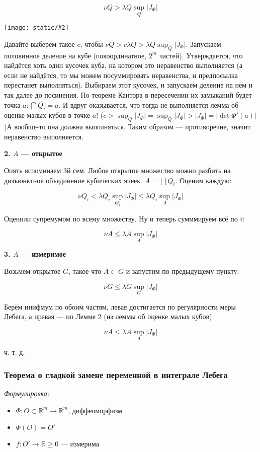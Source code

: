 \documentclass{article}
\def\images#1#2{\begin{center}\texttt{[image: static/\#2]}\end{center}}
\begin{document}
\[\nu Q > \lambda Q \sup_{Q} |J_{\Phi}|\]

\images{0.3}{diff_del.jpg}

Давайте выберем такое $c$, чтобы $\nu Q > c \lambda Q > \lambda Q \sup_{Q} |J_{\Phi}|$. Запускаем половинное деление на кубе (покоординатное, $2^m$ частей). Утверждается, что найдётся хоть один кусочек куба, на котором это неравенство выполняется (а если не найдётся, то мы можем посуммировать неравенства, и предпосылка перестанет выполняться). Выбираем этот кусочек, и запускаем деление на нём и так далее до посинения. По теореме Кантора в пересечении их замыканий будет точка $a: \bigcap \overline{Q_i} = a$. И вдруг оказывается, что тогда не выполняется лемма об оценке малых кубов в точке $a$! ($c > \sup_{Q} |J_{\Phi}| = \sup_{\overline{Q}} |J_{\Phi}| > |J_{\Phi}| = |\det \Phi'(a)|$)А вообще-то она должна выполняться. Таким образом --- противоречие, значит неравенство выполняется.

\textbf{2. $A$ --- открытое}

Опять вспоминаем 3й сем. Любое открытое множество можно разбить на дизъюнктное объединение кубических ячеек. $A = \bigsqcup Q_i$. Оценим каждую:

\[\nu Q_i < \lambda Q_i \sup_{Q_i} |J_{\Phi}| \le \lambda Q_i \sup_{A} |J_{\Phi}|\]

Оценили супремумом по всему множеству. Ну и теперь сумммируем всё по $i$:

\[\nu A \le \lambda A \sup_{A} |J_{\Phi}|\]

\textbf{3. $A$ --- измеримое}

Возьмём открытое $G$, такое что $A \subset G$ и запустим по предыдущему пункту:

\[\nu G \le \lambda G \sup_{G} |J_{\Phi}|\]

Берём инифмум по обоим частям, левая достигается по регулярности меры Лебега, а правая --- по Лемме 2 (из леммы об оценке малых кубов).

\[\nu A \le \lambda A \sup_{A} |J_{\Phi}|\]

ч. т. д. 

\subsubsection{Теорема о гладкой замене переменной в интеграле Лебега}
\textit{Формулировка:}

\begin{itemize}
    \item $\Phi: O \subset \mathbb{R}^{m} \rightarrow \mathbb{R}^{m}$, диффеоморфизм
    \item $\Phi(O) = O'$
    \item $f: O' \rightarrow \mathbb{R} \ge 0$ --- измерима
\end{itemize}
\end{document}
